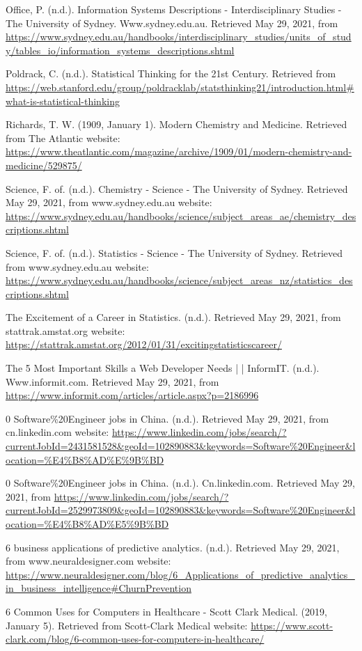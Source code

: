 \documentclass[12pt]{article}
\begin{document}
Office, P. (n.d.). Information Systems Descriptions - Interdisciplinary Studies - The University of Sydney. Www.sydney.edu.au. Retrieved May 29, 2021, from
\url{https://www.sydney.edu.au/handbooks/interdisciplinary_studies/units_of_study/tables_io/information_systems_descriptions.shtml}

Poldrack, C. (n.d.). Statistical Thinking for the 21st Century. Retrieved from
\url{https://web.stanford.edu/group/poldracklab/statsthinking21/introduction.html#what-is-statistical-thinking}

Richards, T. W. (1909, January 1). Modern Chemistry and Medicine. Retrieved from The Atlantic website:
\url{https://www.theatlantic.com/magazine/archive/1909/01/modern-chemistry-and-medicine/529875/}

Science, F. of. (n.d.). Chemistry - Science - The University of Sydney. Retrieved May 29, 2021, from www.sydney.edu.au website:
\url{https://www.sydney.edu.au/handbooks/science/subject_areas_ae/chemistry_descriptions.shtml}

Science, F. of. (n.d.). Statistics - Science - The University of Sydney. Retrieved from www.sydney.edu.au website:
\url{https://www.sydney.edu.au/handbooks/science/subject\_areas\_nz/statistics\_descriptions.shtml}

The Excitement of a Career in Statistics. (n.d.). Retrieved May 29, 2021, from stattrak.amstat.org website:
\url{https://stattrak.amstat.org/2012/01/31/excitingstatisticscareer/}

The 5 Most Important Skills a Web Developer Needs | | InformIT. (n.d.). Www.informit.com. Retrieved May 29, 2021, from
\url{ https://www.informit.com/articles/article.aspx?p=2186996}

0 Software\%20Engineer jobs in China. (n.d.). Retrieved May 29, 2021, from cn.linkedin.com website:
\url{https://www.linkedin.com/jobs/search/?currentJobId=2431581528&geoId=102890883&keywords=Software\%20Engineer&location=\%E4\%B8\%AD\%E\%9B\%BD}

0 Software\%20Engineer jobs in China. (n.d.). Cn.linkedin.com. Retrieved May 29, 2021, from
\url{ https://www.linkedin.com/jobs/search/?currentJobId=2529973809&geoId=102890883&keywords=Software\%20Engineer&location=\%E4\%B8\%AD\%E5\%9B\%BD}

6 business applications of predictive analytics. (n.d.). Retrieved May 29, 2021, from www.neuraldesigner.com website:
\url{https://www.neuraldesigner.com/blog/6\_Applications\_of\_predictive\_analytics\_in\_business\_intelligence#ChurnPrevention}

6 Common Uses for Computers in Healthcare - Scott Clark Medical. (2019, January 5). Retrieved from Scott-Clark Medical website:
\url{https://www.scott-clark.com/blog/6-common-uses-for-computers-in-healthcare/}
\end{document}
